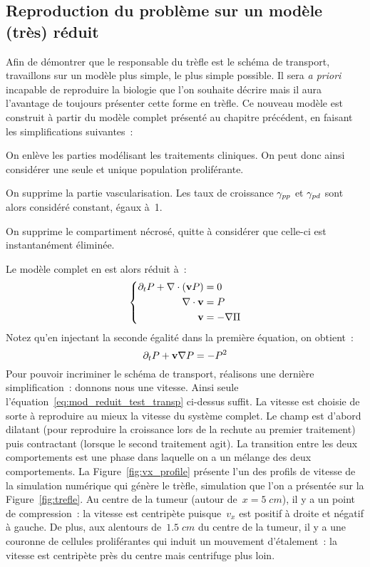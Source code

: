 \documentclass[main.tex]{subfiles}
\begin{document}
\subsection{Reproduction du problème sur un modèle (très) réduit}
Afin de démontrer que le responsable du trèfle est le schéma de transport, travaillons sur un modèle plus simple, le plus simple possible. Il sera \textit{a priori} incapable de reproduire la biologie que l'on souhaite décrire mais il aura l'avantage de toujours présenter cette forme en trèfle. 
Ce nouveau modèle est construit à partir du modèle complet présenté au chapitre précédent, en faisant les simplifications suivantes~:
\begin{myitemize}
\item On enlève les parties modélisant les traitements cliniques. On peut donc ainsi considérer une seule et unique population proliférante.
\item On supprime la partie vascularisation. Les taux de croissance $\gamma_{pp}$ et $\gamma_{pd}$ sont alors considéré constant, égaux à~1.
\item On supprime le compartiment nécrosé, quitte à considérer que celle-ci est instantanément éliminée.
\end{myitemize}
Le modèle complet en est alors réduit à~:
\begin{equation}
\left\{ \begin{aligned}
\partial_t P + \nabla\cdot (\mathbf{v} P) &= 0 \\
\nabla\cdot \mathbf{v} &= P  \\
\mathbf{v} &= -\nabla \Pi
\end{aligned} \right.
\end{equation}
Notez qu'en injectant la seconde égalité dans la première équation, on obtient~:
\begin{equation}\label{eq:mod_reduit_test_transp}
\partial_t P + \mathbf{v} \nabla P = -P^2
\end{equation}
Pour pouvoir incriminer le schéma de transport, réalisons une dernière simplification~: donnons nous une vitesse. Ainsi seule l'équation~\eqref{eq:mod_reduit_test_transp} ci-dessus suffit. La vitesse est choisie de sorte à reproduire au mieux la vitesse du système complet. Le champ est d'abord dilatant (pour reproduire la croissance lors de la rechute au premier traitement) puis contractant (lorsque le second traitement agit). La transition entre les deux comportements est une phase dans laquelle on a un mélange des deux comportements. 
La Figure~\ref{fig:vx_profile} présente l'un des profils de vitesse de la simulation numérique qui génère le trèfle, simulation que l'on a présentée sur la Figure~\ref{fig:trefle}. 
Au centre de la tumeur (autour de~$x=5\;cm$), il y a un point de compression~: 
la vitesse est centripète puisque~$v_x$ est positif à droite et négatif à gauche. 
De plus, aux alentours de~$1.5\;cm$ du centre de la tumeur, il y a une couronne de cellules proliférantes qui induit un mouvement d'étalement~: la vitesse est centripète près du centre mais centrifuge plus loin. 
\end{document}
